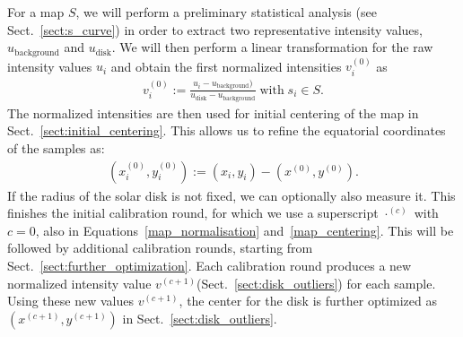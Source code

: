 \documentclass{aa}
\newcommand{\eqnl}[2]{\begin{eqnarray}\label{#1}#2\end{eqnarray}}
\newcommand{\s}[2]{{#1}_{\mathrm{#2}}}
\begin{document}
  For a map $S$, we will perform a preliminary statistical analysis (see Sect.~\ref{sect:s_curve}) in order to extract 
  two representative intensity values, $\s{u}{background}$ and $\s{u}{disk}$. We will then perform a linear 
  transformation for the raw intensity values $u_i$ and obtain the first normalized intensities $v_i^{(0)}$ as
  \eqnl{map_normalisation}{
  v_i^{(0)} := \frac{u_i - \s{u}{background})}{\s{u}{disk} - \s{u}{background}} \; \text{with} \; s_i \in S \text{.}
  }
  The normalized intensities are then used for initial centering of the map in Sect.~\ref{sect:initial_centering}. 
  This allows us to refine the equatorial coordinates of the samples as:
  \eqnl{map_centering}{
  \left( x_i^{(0)}, y_i^{(0)} \right) := \left( x_i, y_i \right) - \left( x^{(0)}, y^{(0)} \right) \text{.}
  }
  If the radius of the solar disk is not fixed, we can optionally also measure it. This finishes the initial calibration 
  round, for which we use a superscript $\cdot^{(c)}$ with $c=0$, also in Equations~\ref{map_normalisation} 
  and~\ref{map_centering}. This will be followed by additional calibration rounds, starting from 
  Sect.~\ref{sect:further_optimization}. Each calibration round produces a new normalized intensity value 
  $v^{(c+1)}$(Sect.~\ref{sect:disk_outliers}) for each sample. Using these new values $v^{(c+1)}$, the center for the 
  disk is further optimized as $(x^{(c+1)}, y^{(c+1)})$ in Sect.~\ref{sect:disk_outliers}.
\end{document}
